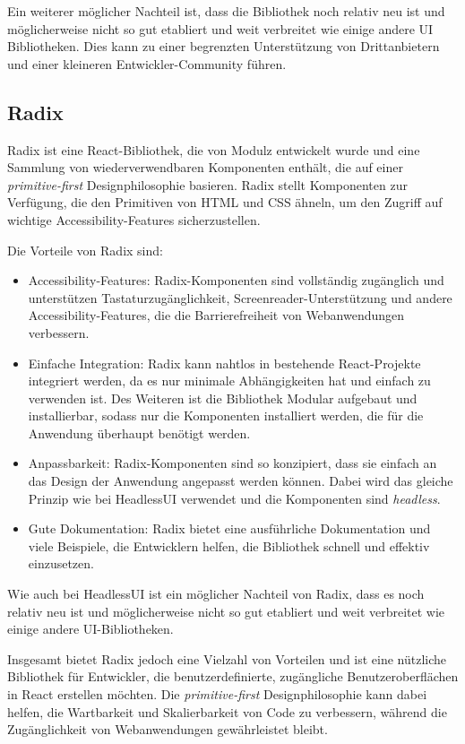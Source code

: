 Ein weiterer möglicher Nachteil ist, dass die Bibliothek noch relativ neu ist und möglicherweise nicht so gut etabliert und weit verbreitet wie einige andere UI Bibliotheken. Dies kann zu einer begrenzten Unterstützung von Drittanbietern und einer kleineren Entwickler-Community führen.

\subsection{Radix}
\label{secsec:radix}

Radix ist eine React-Bibliothek, die von Modulz entwickelt wurde und eine Sammlung von wiederverwendbaren Komponenten enthält, die auf einer \emph{primitive-first} Designphilosophie basieren. Radix stellt Komponenten zur Verfügung, die den Primitiven von HTML und CSS ähneln, um den Zugriff auf wichtige Accessibility-Features sicherzustellen.

Die Vorteile von Radix sind:

\begin{itemize}
    \item Accessibility-Features: Radix-Komponenten sind vollständig zugänglich und unterstützen Tastaturzugänglichkeit, Screenreader-Unterstützung und andere Accessibility-Features, die die Barrierefreiheit von Webanwendungen verbessern.
    \item Einfache Integration: Radix kann nahtlos in bestehende React-Projekte integriert werden, da es nur minimale Abhängigkeiten hat und einfach zu verwenden ist. Des Weiteren ist die Bibliothek Modular aufgebaut und installierbar, sodass nur die Komponenten installiert werden, die für die Anwendung überhaupt benötigt werden.
    \item Anpassbarkeit: Radix-Komponenten sind so konzipiert, dass sie einfach an das Design der Anwendung angepasst werden können. Dabei wird das gleiche Prinzip wie bei HeadlessUI verwendet und die Komponenten sind \emph{headless}.
    \item Gute Dokumentation: Radix bietet eine ausführliche Dokumentation und viele Beispiele, die Entwicklern helfen, die Bibliothek schnell und effektiv einzusetzen.
\end{itemize}

Wie auch bei HeadlessUI ist ein möglicher Nachteil von Radix, dass es noch relativ neu ist und möglicherweise nicht so gut etabliert und weit verbreitet wie einige andere UI-Bibliotheken.

Insgesamt bietet Radix jedoch eine Vielzahl von Vorteilen und ist eine nützliche Bibliothek für Entwickler, die benutzerdefinierte, zugängliche Benutzeroberflächen in React erstellen möchten. Die \emph{primitive-first} Designphilosophie kann dabei helfen, die Wartbarkeit und Skalierbarkeit von Code zu verbessern, während die Zugänglichkeit von Webanwendungen gewährleistet bleibt.